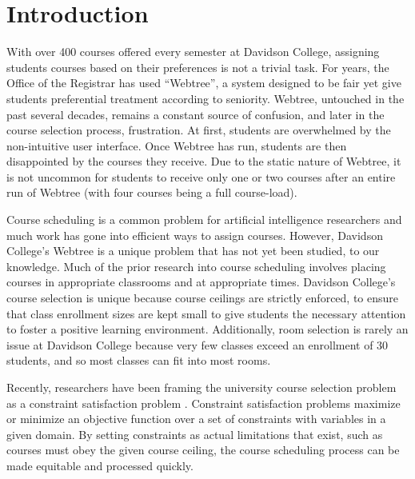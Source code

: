 
\section{Introduction}
\label{sec:intro}

With over 400 courses offered every semester at Davidson College,
assigning students courses based on their preferences is not a trivial
task. For years, the Office of the Registrar has used ``Webtree'', a
system designed to be fair yet give students preferential treatment
according to seniority. Webtree, untouched in the past several decades, remains a constant
source of confusion, and later in the course selection process,
frustration. At first, students are overwhelmed by the non-intuitive
user interface. Once Webtree has run, students are then disappointed
by the courses they receive. Due to the static nature of Webtree, it
is not uncommon for students to receive only one or two courses after
an entire run of Webtree (with four courses being a full
course-load). 

Course scheduling is a common problem for artificial intelligence
researchers and much work has gone into efficient ways to assign
courses. However, Davidson College's Webtree is a unique problem that
has not yet been studied, to our knowledge. Much of the prior research
into course scheduling involves placing courses in appropriate
classrooms and at appropriate times. Davidson College's course
selection is unique because course ceilings are strictly enforced, to
ensure that class enrollment sizes are kept small to give students the
necessary attention to foster a positive learning
environment. Additionally, room selection is rarely an issue at
Davidson College because very few classes exceed an enrollment of $30$
students, and so most classes can fit into most rooms.

Recently, researchers have been framing the university course
selection problem as a constraint satisfaction problem
\cite{darden}. Constraint satisfaction problems maximize or minimize
an objective function over a set of constraints with variables in a
given domain. By setting constraints as actual limitations that exist,
such as courses must obey the given course ceiling, the course
scheduling process can be made equitable and processed quickly.
 
